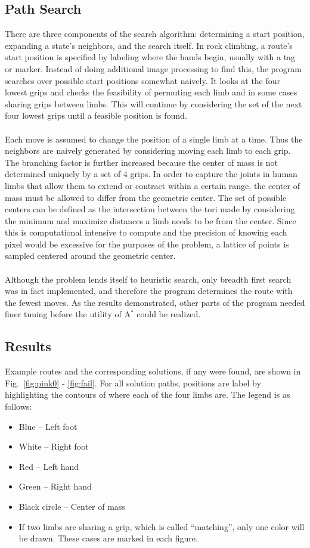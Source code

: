 \documentclass[pdftex,12pt]{article}
\theoremstyle{definition}
\theoremstyle{remark}
\begin{document}
\subsection*{Path Search}
There are three components of the search algorithm: determining a start position, expanding a state's neighbors, and the search itself. In rock climbing, a route's start position is specified by labeling where the hands begin, usually with a tag or marker. Instead of doing additional image processing to find this, the program searches over possible start positions somewhat naively. It looks at the four lowest grips and checks the feasibility of permuting each limb and in some cases sharing grips between limbs. This will continue by considering the set of the next four lowest grips until a feasible position is found.\\ \\
Each move is assumed to change the position of a single limb at a time. Thus the neighbors are naively generated by considering moving each limb to each grip. The branching factor is further increased because the center of mass is not determined uniquely by a set of 4 grips. In order to capture the joints in human limbs that allow them to extend or contract within a certain range, the center of mass must be allowed to differ from the geometric center. The set of possible centers can be defined as the intersection between the tori made by considering the minimum and maximize distances a limb needs to be from the center. Since this is computational intensive to compute and the precision of knowing each pixel would be excessive for the purposes of the problem, a lattice of points is sampled centered around the geometric center.\\ \\
Although the problem lends itself to heuristic search, only breadth first search was in fact implemented, and therefore the program determines the route with the fewest moves. As the results demonstrated, other parts of the program needed finer tuning before the utility of A$^*$ could be realized.
\subsection*{Results}
Example routes and the corresponding solutions, if any were found, are shown in Fig.~\eqref{fig:pink0} - \eqref{fig:fail}. For all solution paths, positions are label by highlighting the contours of where each of the four limbs are. The legend is as follows:

\begin{itemize}
 \item Blue -- Left foot
 \item White -- Right foot
 \item Red -- Left hand
 \item Green -- Right hand
 \item Black circle -- Center of mass
 \item If two limbs are sharing a grip, which is called ``matching'', only one color will be drawn. These cases are marked in each figure.
\end{itemize}
\end{document}
